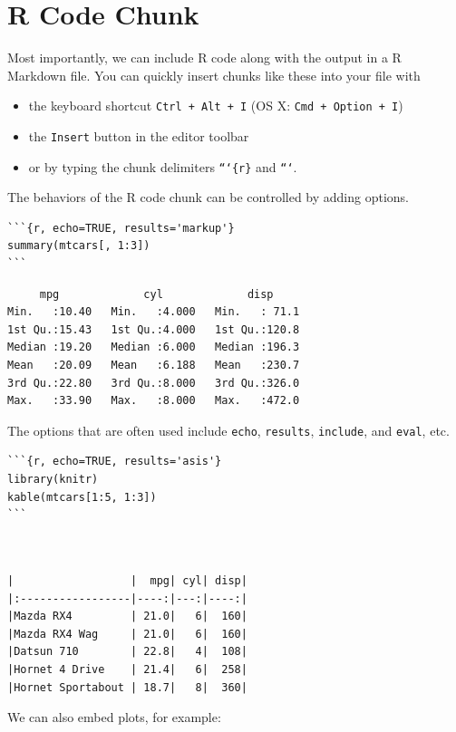 \documentclass[11pt]{article}
\begin{document}
\section{R Code Chunk}
\label{sec:org62e6c5d}

Most importantly, we can include R code along with the output in a R
Markdown file. You can quickly insert chunks like these into your file
with

\begin{itemize}
\item the keyboard shortcut \texttt{Ctrl + Alt + I} (OS X: \texttt{Cmd + Option + I})
\item the \texttt{Insert} button in the editor toolbar
\item or by typing the chunk delimiters \texttt{```\{r\}} and \texttt{```}.
\end{itemize}

The behaviors of the R code chunk can be controlled by adding options.

\begin{verbatim}
```{r, echo=TRUE, results='markup'}
summary(mtcars[, 1:3])
```
\end{verbatim}

\begin{verbatim}
     mpg             cyl             disp
Min.   :10.40   Min.   :4.000   Min.   : 71.1
1st Qu.:15.43   1st Qu.:4.000   1st Qu.:120.8
Median :19.20   Median :6.000   Median :196.3
Mean   :20.09   Mean   :6.188   Mean   :230.7
3rd Qu.:22.80   3rd Qu.:8.000   3rd Qu.:326.0
Max.   :33.90   Max.   :8.000   Max.   :472.0
\end{verbatim}

The options that are often used include \texttt{echo}, \texttt{results}, \texttt{include},
and \texttt{eval}, etc.

\begin{verbatim}
```{r, echo=TRUE, results='asis'}
library(knitr)
kable(mtcars[1:5, 1:3])
```
\end{verbatim}

\begin{verbatim}


|                  |  mpg| cyl| disp|
|:-----------------|----:|---:|----:|
|Mazda RX4         | 21.0|   6|  160|
|Mazda RX4 Wag     | 21.0|   6|  160|
|Datsun 710        | 22.8|   4|  108|
|Hornet 4 Drive    | 21.4|   6|  258|
|Hornet Sportabout | 18.7|   8|  360|
\end{verbatim}

We can also embed plots, for example:
\end{document}
